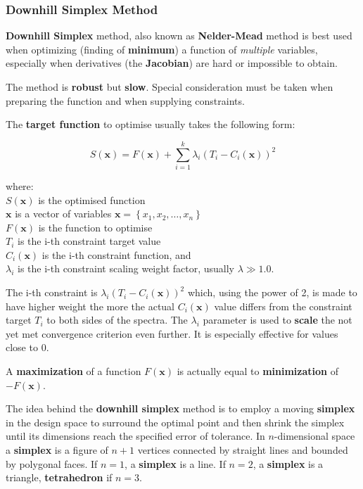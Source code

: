 \subsubsection{Downhill Simplex Method}

\textbf{Downhill Simplex} method, also known as \textbf{Nelder-Mead} method
is best used when optimizing (finding of \textbf{minimum}) a function of
\textit{multiple} variables, especially when derivatives (the \textbf{Jacobian})
are hard or impossible to obtain.

The method is \textbf{robust} but \textbf{slow}. Special consideration must be
taken when preparing the function and when supplying constraints.

The \textbf{target function} to optimise usually takes the following form:

\begin{equation}
    S(\mathbf{x}) = F(\mathbf{x}) + \sum_{i=1}^{k} \lambda_i \left( T_i - C_i(\mathbf{x}) \right)^2
\end{equation}

where: \\
$ S(\mathbf{x}) $ is the optimised function \\
$ \mathbf{x} $ is a vector of variables $ \mathbf{x} = \left\{ x_1, x_2, \ldots , x_n \right\} $ \\
$ F(\mathbf{x}) $ is the function to optimise \\
$ T_i $ is the i-th constraint target value \\
$ C_i(\mathbf{x}) $ is the i-th constraint function, and \\
$ \lambda_i $ is the i-th constraint scaling weight factor, usually $ \lambda \gg 1.0 $.

The i-th constraint is $ \lambda_i \left(T_i - C_i(\mathbf{x}) \right)^2 $ which,
using the power of 2, is made to have higher weight the more the actual
$ C_i(\mathbf{x}) $ value differs from the constraint target $ T_i $ to both
sides of the spectra. The $ \lambda_i $ parameter is used to \textbf{scale}
the not yet met convergence criterion even further. It is especially effective
for values close to $ 0 $.

\begin{bbox}
    A \textbf{maximization} of a function $ F(\mathbf{x}) $ is actually equal to
    \textbf{minimization} of $ -F(\mathbf{x}) $.
\end{bbox}

The idea behind the \textbf{downhill simplex} method is to employ
a moving \textbf{simplex} in the design space to surround the optimal point and
then shrink the simplex until its dimensions reach the specified error of tolerance.
In $ n $-dimensional space a \textbf{simplex} is a figure of $ n + 1 $ vertices
connected by straight lines and bounded by polygonal faces. If $ n = 1 $,
a \textbf{simplex} is a line. If $ n = 2 $, a \textbf{simplex} is a triangle,
\textbf{tetrahedron} if $ n = 3 $.

